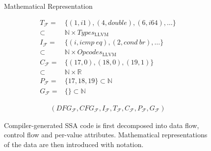 \begin{figure}[p]
\begin{blackbox}{Mathematical Representation}
\begin{minipage}{0.329\textwidth}
\begin{graybox}
            \vspace{4.36em}
        \end{graybox}
    \end{minipage}
    \begin{minipage}{0.329\textwidth}
        \centering
        \begin{graybox}
            \scriptsize
            \setlength{\abovedisplayskip}{0pt}
            \setlength{\belowdisplayskip}{0pt}
            \vspace{-0.5em}
            \begin{align*}
                T_\mathcal F={}&\{(1,i1),(4,double),(6,i64),\dots\}\\[-0.5em]
                      \subset{}&\mathbb N\times Types_\text{LLVM}\\[-0.25em]
                I_\mathcal F={}&\{(i,icmp\ eq),(2,cond\ br),\dots\}\\[-0.5em]
                      \subset{}&\mathbb N\times Opcodes_\text{LLVM}\\[-0.25em]
                C_\mathcal F={}&\{(17,0),(18,0),(19,1)\}\\[-0.5em]
                      \subset{}&\mathbb N\times\mathbb R\\[-0.25em]
                P_\mathcal F={}&\{17,18,19\}\subset\mathbb N\\[-0.25em]
                G_\mathcal F={}&\{\}\subset\mathbb N
            \end{align*}

            \vspace{0.45em}
        \end{graybox}
    \end{minipage}

    \begin{minipage}{14.4cm}
        \begin{graybox}
            \setlength{\abovedisplayskip}{0pt}
            \setlength{\belowdisplayskip}{0pt}
            \vspace{-0.5em}
            \begin{align*}
                (DFG_\mathcal{F},
                 CFG_\mathcal{F},
                 I_\mathcal{F},
                 T_\mathcal{F},
                 C_\mathcal{F},
                 P_\mathcal{F},
                 G_\mathcal{F})
            \end{align*}
        \end{graybox}
    \end{minipage}
\end{blackbox}
\caption{Compiler-generated SSA code is first decomposed into data flow, control
         flow and per-value attributes.
         Mathematical representations of the data are then introduced with
         notation.}
\label{fig:derivemaths}
\end{figure}

